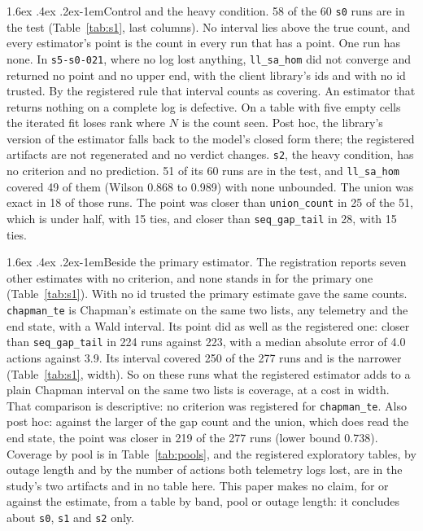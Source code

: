\documentclass[11pt]{article}
\makeatletter
\renewcommand\paragraph{\@startsection{paragraph}{4}{\z@}%
  {1.6ex \@plus .4ex \@minus .2ex}{-1em}{\normalfont\normalsize\bfseries}}
\makeatother
\begin{document}
\paragraph{Control and the heavy condition.} 58 of the 60 \texttt{s0} runs are in the
test (Table~\ref{tab:s1}, last columns). No interval lies above the true count, and every
estimator's point is the count in every run that has a point. One run has none. In
\texttt{s5-s0-021}, where no log lost anything, \texttt{ll\_sa\_hom} did not converge
and returned no point and no upper end, with the client library's ids and with no id
trusted. By the registered rule that interval counts as covering. An estimator that
returns nothing on a complete log is defective. On a table with five empty cells the iterated fit loses rank where $N$ is the
count seen. Post hoc, the library's version of the estimator falls back to the model's
closed form there; the registered artifacts are not regenerated and no verdict changes.
\texttt{s2}, the heavy condition, has no criterion and no prediction. 51 of its 60 runs
are in the test, and \texttt{ll\_sa\_hom} covered 49 of them (Wilson 0.868 to 0.989)
with none unbounded. The union was exact in 18 of those
runs. The point was closer than \texttt{union\_count} in 25 of the 51, which is under
half, with 15 ties, and closer than \texttt{seq\_gap\_tail} in 28, with 15 ties.

\paragraph{Beside the primary estimator.} The registration reports seven other estimates
with no criterion, and none stands in for the primary one (Table~\ref{tab:s1}). With no
id trusted the primary estimate gave the same counts. \texttt{chapman\_te} is Chapman's
estimate on the same two lists, any telemetry and the end state, with a Wald interval.
Its point did as well as the registered one: closer than \texttt{seq\_gap\_tail} in
224 runs against 223, with a median absolute error of 4.0 actions against 3.9. Its
interval covered 250 of the 277 runs and is the narrower (Table~\ref{tab:s1}, width).
So on these runs what the registered estimator adds to a plain Chapman interval on the
same two lists is coverage, at a cost in width. That comparison is descriptive: no
criterion was registered for \texttt{chapman\_te}. Also post hoc: against the larger of the
gap count and the union, which does read the end state, the point was closer in 219 of
the 277 runs (lower bound 0.738). Coverage by pool is in
Table~\ref{tab:pools}, and the registered exploratory tables, by outage length and by
the number of actions both telemetry logs lost, are in the study's two artifacts and
in no table here. This paper makes no claim, for or against the estimate, from a
table by band, pool or outage length: it concludes about \texttt{s0}, \texttt{s1} and
\texttt{s2} only.
\end{document}
